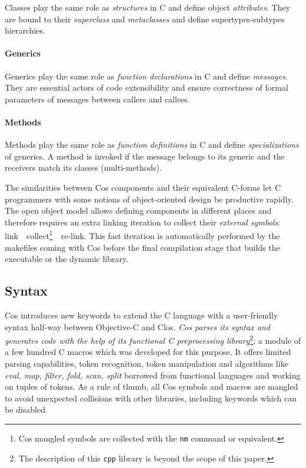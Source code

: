 \documentclass[preprint,10pt]{sigplanconf}
\newcommand{\ProgLang}[1]{{\sc #1}\xspace}
\newcommand{\Clos}      {\ProgLang{Clos}}
\newcommand{\Cos}       {\ProgLang{Cos}}
\newcommand{\Objc}      {\ProgLang{Objective-C}}
\newcommand{\code}[1]{\lstinline[language=COS,style=samplecode]|#1|}
\begin{document}
Classes play the same role as {\em structures} in C and define object {\em attributes}. They are bound to their {\em superclass} and {\em metaclasses} and define supertypes-subtypes hierarchies.

\paragraph{Generics}

Generics play the same role as {\em function declarations} in C and define {\em messages}. They are essential actors of code extensibility and ensure correctness of formal parameters of messages between callers and callees.

\paragraph{Methods}

Methods play the same role as {\em function definitions} in C and define {\em specializations} of generics. A method is invoked if the message belongs to its generic and the receivers match its classes (multi-methods).

\mbox{}\newline
The similarities between \Cos components and their equivalent C-forms let C programmers with some notions of object-oriented design be productive rapidly. The open object model allows defining components in different places and therefore requires an extra linking iteration to collect their {\em external symbols}: link~~collect\footnote{\Cos mangled symbols are collected with the {\tt nm} command or equivalent.}~~re-link. This fast iteration is automatically performed by the makefiles coming with \Cos before the final compilation stage that builds the executable or the dynamic library.

\subsection{Syntax}

\Cos introduces new keywords to extend the C language with a user-friendly syntax half-way between \Objc and \Clos. {\em\Cos parses its syntax and generates code with the help of its functional C preprocessing library}\footnote{The description of this \code{cpp} library is beyond the scope of this paper.}; a module of a few hundred C macros which was developed for this purpose. It offers limited parsing capabilities, token recognition, token manipulation and algorithms like {\em eval, map, filter, fold, scan, split} borrowed from functional languages and working on tuples of tokens.
As a rule of thumb, all \Cos symbols and macros are mangled to avoid unexpected collisions with other libraries, including keywords which can be disabled. 
\end{document}
